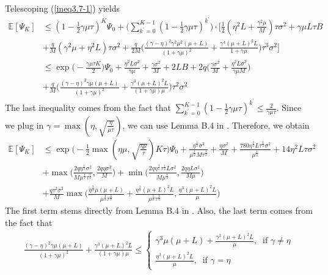 \documentclass[11pt]{article}
\begin{document}
Telescoping (\ref{ineq3.7-1}) yields
\begin{align*}
    \mathbb{E}[\Psi_{K}] &\leq (1-\frac{1}{2}\gamma\mu\tau)^K\Psi_0 + \Big(\sum_{k^\prime=0}^{K-1}(1-\frac{1}{2}\gamma\mu\tau)^{k^\prime}\Big)\cdot \Big[\frac{1}{2}(\eta^2 L+\frac{\gamma^2\mu}{M})\tau\sigma^2+ \gamma\mu L \tau B\\
     &+ \frac{q}{M}(\gamma^2\mu+\eta^2 L)\tau\sigma^2 + \frac{q}{2M}\Big(\frac{(\gamma-\eta)^2\gamma^2\mu^2(\mu+L)}{(1+\gamma\mu)^2} + \frac{\gamma^4(\mu+L)^2 L}{1+\gamma\mu}\Big)\tau^3\sigma^2 \Big] \\
     &\leq \exp\Big(-\frac{\gamma\mu\tau K}{2}\Big)\Psi_0 + \frac{\eta^2 L\sigma^2}{\gamma\mu} + \frac{\gamma\sigma^2}{M} + 2LB + 2q\Big(\frac{\gamma\sigma^2}{M}+\frac{\eta^2 L\sigma^2}{\gamma\mu M}\Big) \\
     &+ \frac{q}{M}\Big(\frac{(\gamma-\eta)^2 \gamma\mu(\mu+L)}{(1+\gamma\mu)^2}+\frac{\gamma^3(\mu+L)^2 L}{(1+\gamma\mu)\mu}\Big)\tau^2\sigma^2
\end{align*}
The last inequality comes from the fact that $\sum_{k^\prime=0}^{K-1}(1-\frac{1}{2}\gamma\mu\tau)^{k^\prime} \leq \frac{2}{\gamma\mu\tau}$. Since we plug in $\gamma = \max(\eta, \sqrt{\frac{\eta}{\mu\tau}})$, we can use Lemma B.4 in \cite{Yeojoon-yuan2020federated}. Therefore, we obtain
\begin{align*}
    \mathbb{E}[\Psi_K] &\leq \exp{\Big(-\frac{1}{2}\max(\eta\mu, \sqrt{\frac{\eta\mu}{\tau}})K\tau\Big)} \Psi_0 + \frac{\eta^{\frac{1}{2}}\sigma^2}{\mu^{\frac{1}{2}}M\tau^{\frac{1}{2}}} + \frac{\eta\sigma^2}{M} + \frac{780\eta^{\frac{3}{2}}L \tau^{\frac{1}{2}}\sigma^2}{\mu^{\frac{1}{2}}}+14\eta^2 L\tau\sigma^2 \\
    &+ \max\Big(\frac{2q\eta^{\frac{1}{2}}\sigma^2}{M\mu^{\frac{1}{2}}\tau^{\frac{1}{2}}}, \frac{2q\eta\sigma^2}{M}\Big) + \min\Big(\frac{2q\eta^{\frac{3}{2}}\tau^{\frac{1}{2}}L \sigma^2}{M\mu^{\frac{1}{2}}}, \frac{2q\eta L \sigma^2}{M\mu}\Big) \\
    &+ \frac{q\tau^2\sigma^2}{M}\max\Big(\frac{\eta^{\frac{3}{2}}\mu(\mu+L)}{\mu^{\frac{3}{2}}\tau^{\frac{3}{2}}}+\frac{\eta^{\frac{3}{2}}(\mu+L)^2 L}{\mu^{\frac{5}{2}}\tau^{\frac{3}{2}}}, \frac{\eta^3 (\mu+L)^2 L}{\mu}\Big)
\end{align*}
The first term stems directly from Lemma B.4 in \cite{Yeojoon-yuan2020federated}. Also, the last term comes from the fact that
\begin{align*}
    \frac{(\gamma-\eta)^2 \gamma\mu(\mu+L)}{(1+\gamma\mu)^2}+\frac{\gamma^3(\mu+L)^2 L}{(1+\gamma\mu)\mu} \leq
    \begin{cases}
    \gamma^3\mu(\mu+L) + \frac{\gamma^3(\mu+L)^2 L}{\mu},~\textrm{ if }\gamma \neq \eta\\
    \frac{\eta^3 (\mu+L)^2 L}{\mu},~\textrm{ if } \gamma=\eta
    \end{cases}
\end{align*}
\end{document}
